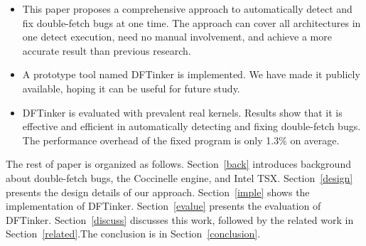 \documentclass[10pt]{llncs}
\begin{document}


\begin{itemize}
\item  This paper proposes a comprehensive approach to automatically detect and fix double-fetch bugs at one time.  %
The approach can cover all architectures in one detect execution, need no manual involvement, and achieve a more accurate result than previous research. 
 
\item A prototype tool named DFTinker is implemented. We have made it publicly available, hoping it can be useful for future study.

\item  DFTinker is evaluated with prevalent real kernels. Results show that it is effective and efficient in automatically detecting and fixing double-fetch bugs. The performance overhead of the fixed program is only 1.3\% on average.


\end{itemize}
The rest of paper is organized as follows. Section~\ref{back} introduces background about double-fetch bugs, the Coccinelle engine, and Intel TSX. Section~\ref{design} presents the design details of our approach. %
Section~\ref{imple} shows the implementation of DFTinker. %
Section~\ref{evalue} presents the evaluation of DFTinker.%
Section~\ref{discuss} discusses this work, followed by the related work in Section~\ref{related}.The conclusion is in Section~\ref{conclusion}.
\end{document}
